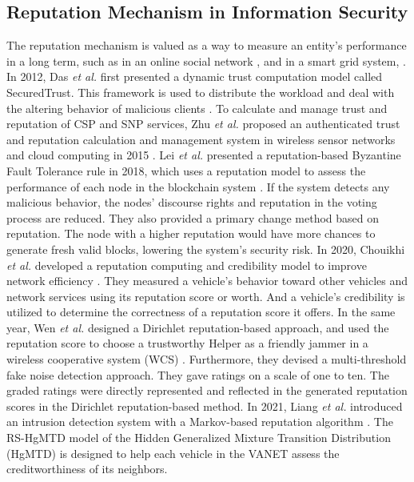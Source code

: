 \documentclass[journal]{IEEEtran}
\begin{document}
\subsection{Reputation Mechanism in Information Security}
The reputation mechanism is valued as a way to measure an entity's performance in a long term, such as in an online social network \cite{ref_27_reputation}, and in a smart grid system, \cite{ref_41_reputation, ref_44_reputation}.
In 2012, Das \textit{et al.} first presented a dynamic trust computation model called SecuredTrust. This framework is used to distribute the workload and deal with the altering behavior of malicious clients \cite{ref_48_reputation}.
To calculate and manage trust and reputation of CSP and SNP services, Zhu \textit{et al.} proposed an authenticated trust and reputation calculation and management system in wireless sensor networks and cloud computing in 2015 \cite{ref_47_reputation}.
Lei \textit{et al.} presented a reputation-based Byzantine Fault Tolerance rule in 2018, which uses a reputation model to assess the performance of each node in the blockchain system \cite{ref_25_reputation}. If the system detects any malicious behavior, the nodes' discourse rights and reputation in the voting process are reduced. They also provided a primary change method based on reputation. The node with a higher reputation would have more chances to generate fresh valid blocks, lowering the system's security risk.
In 2020, Chouikhi \textit{et al.} developed a reputation computing and credibility model to improve network efficiency \cite{ref_23_reputation}. They measured a vehicle's behavior toward other vehicles and network services using its reputation score or worth. And a vehicle's credibility is utilized to determine the correctness of a reputation score it offers.
In the same year, Wen \textit{et al.} designed a Dirichlet reputation-based approach, and used the reputation score to choose a trustworthy Helper as a friendly jammer in a wireless cooperative system (WCS) \cite{ref_24_reputation}. Furthermore, they devised a multi-threshold fake noise detection approach. They gave ratings on a scale of one to ten. The graded ratings were directly represented and reflected in the generated reputation scores in the Dirichlet reputation-based method.
In 2021, Liang \textit{et al.} introduced an intrusion detection system with a Markov-based reputation algorithm \cite{ref_46_reputation}. The RS-HgMTD model of the Hidden Generalized Mixture Transition Distribution (HgMTD) is designed to help each vehicle in the VANET assess the creditworthiness of its neighbors.
\end{document}
